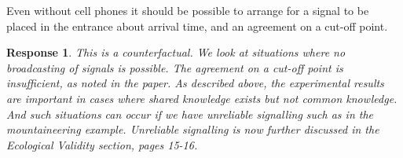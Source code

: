 \documentclass[a4paper]{article}
\newtheorem{response}{Response}
\begin{document}
Even without cell phones it should be possible to arrange for a signal to be placed in the entrance about arrival time, and an agreement on a cut-off point.

\begin{response} 
This is a counterfactual. We look at situations where no broadcasting of signals is possible. The agreement on a cut-off point is insufficient, as noted in the paper. As described above, the experimental results are important in cases where shared knowledge exists but not common knowledge. And such situations can occur if we have unreliable signalling such as in the mountaineering example. Unreliable signalling is now further discussed in the Ecological Validity section, pages 15-16.





\end{response}
\end{document}
